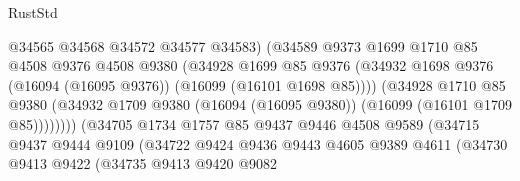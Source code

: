 \begin{lexlean}{RustStd}
\begin{coremodule}
                                      @34565
                                      @34568
                                      @34572
                                      @34577
                                      @34583)
                                    (@34589
                                      @9373
                                      @1699
                                      @1710
                                      @85
                                      @4508
                                      @9376
                                      @4508
                                      @9380
                                      (@34928
                                        @1699
                                        @85
                                        @9376
                                        (@34932
                                          @1698
                                          @9376
                                          (@16094 (@16095 @9376))
                                          (@16099 (@16101 @1698 @85))))
                                      (@34928
                                        @1710
                                        @85
                                        @9380
                                        (@34932
                                          @1709
                                          @9380
                                          (@16094 (@16095 @9380))
                                          (@16099 (@16101 @1709 @85))))))))
                              (@34705
                                @1734
                                @1757
                                @85
                                @9437
                                @9446
                                @4508
                                @9589
                                (@34715
                                  @9437
                                  @9444
                                  @9109
                                  (@34722
                                    @9424
                                    @9436
                                    @9443
                                    @4605
                                    @9389
                                    @4611
                                    (@34730
                                      @9413
                                      @9422
                                      (@34735
                                        @9413
                                        @9420
                                        @9082

\end{coremodule}
\end{lexlean}
